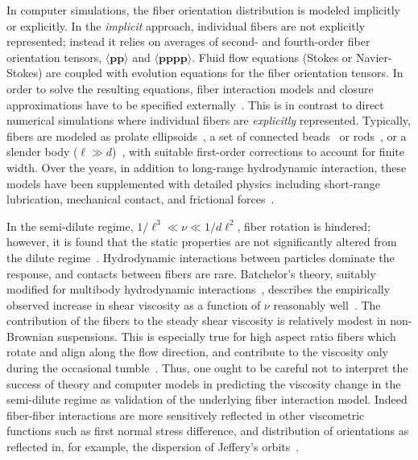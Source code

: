 \documentclass[preprint, 10pt]{elsarticle}
\begin{document}
In computer simulations, the fiber orientation distribution is modeled
implicitly or explicitly. In the \emph{implicit} approach, individual
fibers are not explicitly represented; instead it relies on averages of
second- and fourth-order fiber orientation tensors, $\langle \mathbf{p
p} \rangle$ and $\langle \mathbf{p p p p} \rangle$. Fluid flow equations
(Stokes or Navier-Stokes) are coupled with evolution equations for the
fiber orientation tensors. In order to solve the resulting equations,
fiber interaction models and closure approximations have to be specified
externally~\cite{Advani1987, Advani1990, Ferec2014, Perez2017}. This is
in contrast to direct numerical simulations where individual fibers are
\emph{explicitly} represented. Typically, fibers are modeled as
prolate ellipsoids~\cite{Ausias2006}, a set of connected
beads~\cite{Yamamoto1996, Joung2001} or rods~\cite{Schmid2000,
Lindstroem2007}, or a slender body ($\ell \gg d$)~\cite{Fan1998,
Rahnama1995, tor-she2004, tor-gus2006, gus-tor2009}, with suitable
first-order corrections to account for finite width. Over the years, in
addition to long-range hydrodynamic interaction, these models have been
supplemented with detailed physics including short-range lubrication,
mechanical contact, and frictional forces~\cite{Sundararajakumar1997,
Lindstroem2008}.

In the semi-dilute regime, $1/\ell^3 \ll \nu \ll 1/d\ell^2$, fiber
rotation is hindered; however, it is found that the static
 properties
are not significantly altered from the dilute regime~\cite{larsoncf}.
Hydrodynamic interactions between particles dominate the response, and
contacts between fibers are rare. Batchelor's theory, suitably modified
for multibody hydrodynamic interactions~\cite{Shaqfeh1990,
Mackaplow1996}, describes the empirically observed increase in shear
viscosity as a function of $\nu$ reasonably well~\cite{Stover1992,
Bibbo1987, Petrich2000}. The contribution of the fibers to the steady
shear viscosity is relatively modest in non-Brownian suspensions. This
is especially true for high aspect ratio fibers which rotate and align
along the flow direction, and contribute to the viscosity only during
the occasional tumble~\cite{larsoncf}.  Thus, one ought to be careful
not to interpret the success of theory and computer models in predicting
the viscosity change in the semi-dilute regime as validation of the
underlying fiber interaction model. Indeed fiber-fiber interactions are
more sensitively reflected in other viscometric functions such as first
normal stress difference, and distribution of orientations as reflected
in, for example, the dispersion of Jeffery's
orbits~\cite{Lindstroem2009}.
\end{document}
